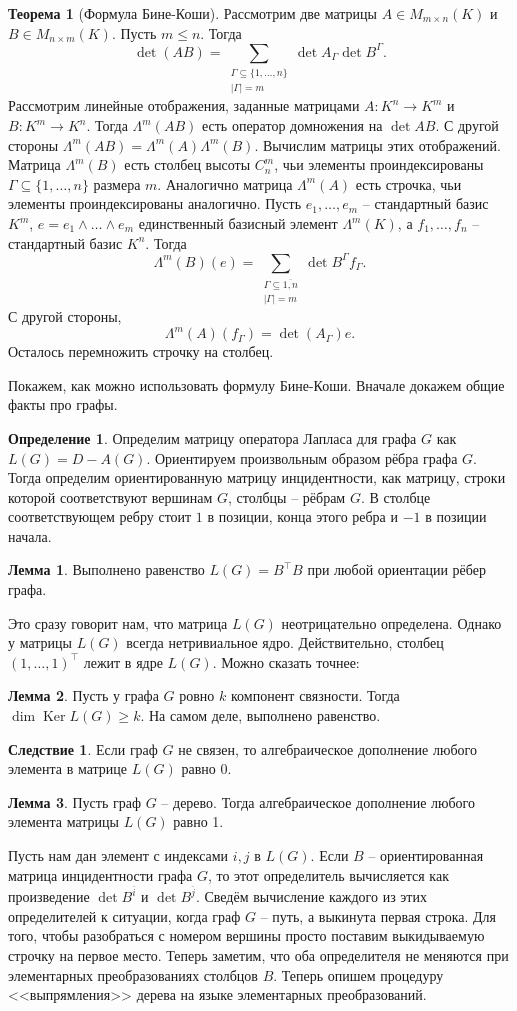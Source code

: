 \documentclass[12pt,a4paper,oneside]{book}
\theoremstyle{definition}
\newtheorem*{defn}{\color{yellow!30!red} Определение}
\newtheorem{thm}{\color{red!40!black}Теорема}
\newtheorem{lem}{\color{green!50!black}Лемма}
\newtheorem{cor}{\color{green!45!black}Следствие}
\renewcommand{\leq}{\leqslant}
\renewcommand{\geq}{\geqslant}
\newcommand{\ovl}{\overline}
\DeclareMathOperator{\Ker}{Ker}
\def\thrm{\begin{thm}}
\def\ethrm{\end{thm}}
\def\dfn{\begin{defn}}
\def\edfn{\end{defn}}
\def\lm{\begin{lem}}
\def\elm{\end{lem}}
\def\crl{\begin{cor}}
\def\ecrl{\end{cor}}
\begin{document}
\thrm[Формула Бине-Коши] Рассмотрим две матрицы $A\in M_{m\times n}(K)$ и $B\in M_{n\times m}(K)$. Пусть $m\leq n$. Тогда
$$\det(AB)=\sum_{\substack{\Gamma \subseteq \{1,\dots,n\}\\ |\Gamma|=m}} \det A_{\Gamma} \det B^{\Gamma}.$$
\proof Рассмотрим линейные отображения, заданные матрицами $A\colon K^n \to K^m$ и  $B \colon K^m \to K^n$. Тогда $\Lambda^m (AB)$ есть оператор домножения на $\det AB$. С другой стороны $\Lambda^m(AB)=\Lambda^m(A) \Lambda^m(B)$. Вычислим матрицы этих отображений. Матрица $\Lambda^m(B)$ есть столбец высоты $C_n^m$, чьи элементы проиндексированы $\Gamma \subseteq \{1,\dots,n\}$ размера $m$. Аналогично матрица $\Lambda^m(A)$  есть строчка, чьи элементы проиндексированы аналогично.
Пусть $e_1,\dots,e_m$ -- стандартный базис $K^m$, $e=e_1\wedge \dots \wedge e_m$ единственный базисный элемент $\Lambda^m(K)$, а $f_1,\dots,f_n$ -- стандартный базис $K^n$. Тогда 
$$\Lambda^m(B)(e)=\sum_{\substack{\Gamma \subseteq \ovl{1,n} \\ |\Gamma|=m}} \det B^{\Gamma} f_{\Gamma}.$$
 С другой стороны, 
$$\Lambda^m(A)(f_{\Gamma})=\det(A_{\Gamma})e.$$
Осталось перемножить строчку на столбец.
\endproof
\ethrm

Покажем, как можно использовать формулу Бине-Коши. Вначале докажем общие факты про графы.

\dfn Определим матрицу оператора Лапласа для графа $G$ как $L(G)=D-A(G)$.
Ориентируем произвольным образом рёбра графа $G$. Тогда определим ориентированную матрицу инцидентности, как матрицу, строки которой соответствуют вершинам $G$, столбцы -- рёбрам $G$. В столбце соответствующем ребру стоит $1$ в позиции, конца этого ребра и $-1$ в позиции начала. 
\edfn

\lm Выполнено равенство $L(G)=B^\top B$ при любой ориентации рёбер графа.
\elm

Это сразу говорит нам, что матрица $L(G)$ неотрицательно определена. Однако у матрицы $L(G)$ всегда нетривиальное ядро. Действительно, столбец $(1,\dots,1)^\top$ лежит в ядре $L(G)$. Можно сказать точнее:

\lm Пусть у графа $G$ ровно $k$ компонент связности. Тогда $\dim \Ker L(G)\geq k$. На самом деле, выполнено равенство.   
\elm

\crl Если граф $G$ не связен, то алгебраическое дополнение любого элемента в матрице $L(G)$ равно $0$.
\ecrl

\lm Пусть граф $G$ -- дерево. Тогда алгебраическое дополнение любого элемента матрицы $L(G)$ равно 1.
\elm
\proof Пусть нам дан элемент с индексами $i,j$ в $L(G)$. Если $B$ -- ориентированная матрица инцидентности графа $G$, то этот определитель вычисляется как произведение  $\det B^{\ovl{i}}$ и $\det B^{\ovl{j}}$. Сведём вычисление каждого из этих определителей к ситуации, когда граф $G$ -- путь, а выкинута первая строка. Для того, чтобы разобраться с номером вершины просто поставим выкидываемую строчку на первое место. Теперь заметим, что оба определителя не меняются при элементарных преобразованиях столбцов $B$.
Теперь опишем процедуру <<выпрямления>> дерева на языке элементарных преобразований. 
\endproof
\end{document}

